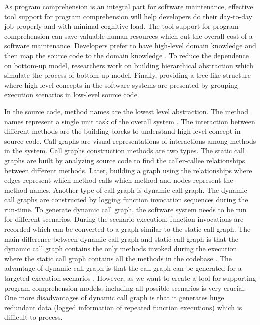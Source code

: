  As program comprehension is an integral part for software maintenance, effective tool support for program comprehension will help developers do their day-to-day job properly and with minimal cognitive load. The tool support for program comprehension can save valuable human resources which cut the overall cost of a software maintenance. Developers prefer to have high-level domain knowledge and then map the source code to the domain knowledge \cite{brooks1983theoryComprehensionPrograms}. To reduce the dependence on bottom-up model, researchers work on building hierarchical abstraction which simulate the process of bottom-up model. Finally, providing a tree like structure where high-level concepts in the software systems are presented by grouping execution scenarios in low-level source code. 


In the source code, method names are the lowest level abstraction. The method names represent a single unit task of the overall system \cite{de2012IRMethodsArtifacts, starke2009searching}. The interaction between different methods are the building blocks to understand high-level concept in source code. Call graphs are visual representations of interactions among methods in the system. Call graphs construction methods are two types. The static call graphs are built by analyzing source code to find the caller-callee relationships between different methods. Later, building a graph using the relationships where edges represent which method calls which method and nodes represent the method names. Another type of call graph is dynamic call graph. The dynamic call graphs are constructed by logging function invocation sequences during the run-time. To generate dynamic call graph, the software system needs to be run for different scenarios. During the scenario execution, function invocations are recorded which can be converted to a graph similar to the static call graph. The main difference between dynamic call graph and static call graph is that the dynamic call graph contains the only methods invoked during the execution where the static call graph contains all the methods in the codebase \cite{gharibi2018automaticStaticCluster}. The advantage of dynamic call graph is that the call graph can be generated for a targeted execution scenarios \cite{feng2018hierarchicalExecutionComprehension}. However, as we want to create a tool for supporting program comprehension models, including all possible scenarios is very crucial. One more disadvantages of dynamic call graph is that it generates huge redundant data (logged information of repeated function executions) which is difficult to process. 

